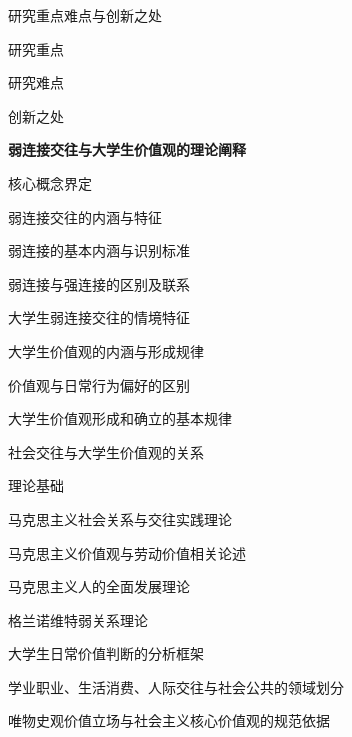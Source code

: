 \begin{thesisframework}
\begin{thesisoutline}
\begin{thesisoutline}
\begin{thesisoutline}
    \end{thesisoutline}
    \item 研究重点难点与创新之处
    \begin{thesisoutline}
      \item 研究重点
      \item 研究难点
      \item 创新之处
    \end{thesisoutline}
  \end{thesisoutline}
  \item \textbf{弱连接交往与大学生价值观的理论阐释}
  \begin{thesisoutline}
    \item 核心概念界定
    \begin{thesisoutline}
      \item 弱连接交往的内涵与特征
      \begin{thesisoutline}
        \item 弱连接的基本内涵与识别标准
        \item 弱连接与强连接的区别及联系
        \item 大学生弱连接交往的情境特征
      \end{thesisoutline}
      \item 大学生价值观的内涵与形成规律
      \begin{thesisoutline}
        \item 价值观与日常行为偏好的区别
        \item 大学生价值观形成和确立的基本规律
        \item 社会交往与大学生价值观的关系
      \end{thesisoutline}
    \end{thesisoutline}
    \item 理论基础
    \begin{thesisoutline}
      \item 马克思主义社会关系与交往实践理论
      \item 马克思主义价值观与劳动价值相关论述
      \item 马克思主义人的全面发展理论
      \item 格兰诺维特弱关系理论
    \end{thesisoutline}
    \item 大学生日常价值判断的分析框架
    \begin{thesisoutline}
      \item 学业职业、生活消费、人际交往与社会公共的领域划分
      \item 唯物史观价值立场与社会主义核心价值观的规范依据

\end{thesisoutline}
\end{thesisoutline}
\end{thesisoutline}
\end{thesisframework}
